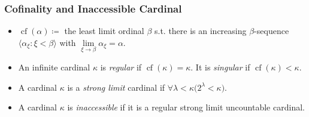 \documentclass[UTF8,11pt,colorlinks,compress,openany]{beamer}%
\begin{document}
\begin{frame}\frametitle{Cofinality and Inaccessible Cardinal}
\begin{itemize}
\item $\operatorname{cf}(\alpha)\coloneqq $ the least limit ordinal $\beta$ s.t. there is an increasing $\beta$-sequence $\langle\alpha_\xi:\xi<\beta\rangle$ with $\lim\limits_{\xi\to\beta}\alpha_\xi=\alpha$.
\item An infinite cardinal $\kappa$ is \emph{regular} if $\operatorname{cf}(\kappa)=\kappa$. It is \emph{singular} if $\operatorname{cf}(\kappa)<\kappa$.
\item A cardinal $\kappa$ is a \emph{strong limit} cardinal if $\forall \lambda<\kappa\big(2^\lambda<\kappa\big)$.
\item A cardinal $\kappa$ is \emph{inaccessible} if it is a regular strong limit uncountable cardinal.
\end{itemize}
\end{frame}
\end{document}
